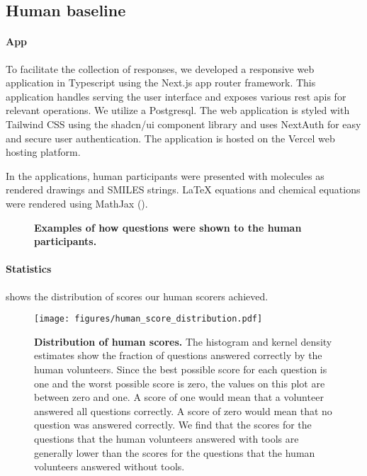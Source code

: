 \clearpage
\subsection{Human baseline} \label{sec:human_baseline}
\paragraph{App} To facilitate the collection of responses, we developed a responsive web application in Typescript using the Next.js\autocite{nextjs} app router framework.
This application handles serving the user interface and exposes various \gls{rest} \glspl{api} for relevant operations.
We utilize a Postgresql.
The web application is styled with Tailwind CSS\autocite{tailwindcss} using the shadcn/ui component library and uses NextAuth\autocite{nextauth} for easy and secure user authentication.
The application is hosted on the Vercel web hosting platform.

In the applications, human participants were presented with molecules as rendered drawings and SMILES strings. \LaTeX\xspace equations and chemical equations were rendered using MathJax ().


\begin{figure}

    \caption{\textbf{Examples of how questions were shown to the human participants.}}
    \label{fig:screenshots}
\end{figure}

\paragraph{Statistics}
 shows the distribution of scores our human scorers achieved.

\begin{figure}[htb]
    \centering
    \texttt{[image: figures/human\_score\_distribution.pdf]}
    \caption{\textbf{Distribution of human scores.} The histogram and kernel density estimates show the fraction of questions answered correctly by the human volunteers.
    Since the best possible score for each question is one and the worst possible score is zero, the values on this plot are between zero and one. A score of one would mean that a volunteer answered all questions correctly. A score of zero would mean that no question was answered correctly.
    We find that the scores for the questions that the human volunteers answered with tools are generally lower than the scores for the questions that the human volunteers answered without tools.
    }
    \label{fig:human_score_distribution}
\end{figure}

